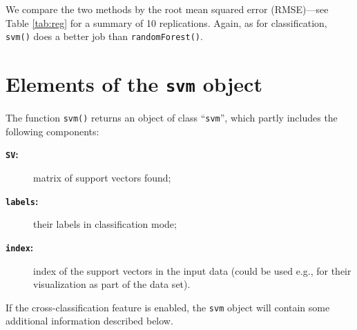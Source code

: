 \documentclass[a4paper]{article}
\begin{document}
\noindent We compare the two methods by the root mean squared error (RMSE)---see Table
\ref{tab:reg} for a summary of 10 replications. 
Again, as for classification, \texttt{svm()}
does a better job than \texttt{randomForest()}.

\section*{Elements of the \texttt{svm} object}

The function \texttt{svm()} returns an object of class ``\texttt{svm}'',
which partly includes the following components:

\begin{description}
 \item[\textbf{\texttt{SV}:}] matrix of support vectors found;
 \item[\textbf{\texttt{labels}:}] their labels in classification mode;
 \item[\textbf{\texttt{index}:}] index of the support vectors in the input data (could
  be used e.g., for their visualization as part of the data set).
\end{description}
If the cross-classification feature is enabled, the
\texttt{svm} object will contain some additional information described below.
\end{document}
